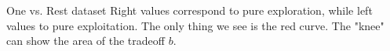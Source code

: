 \documentclass{beamer}
\begin{document}
\begin{frame}{One vs. Rest  dataset}
Right values correspond to pure exploration, while left values to pure exploitation.
The only thing we see is the red curve. The "knee" can show the area of the tradeoff $b.$

\begin{figure}
\begin{centering}
\end{centering}
\end{figure}
\end{frame}

%
\end{document}
